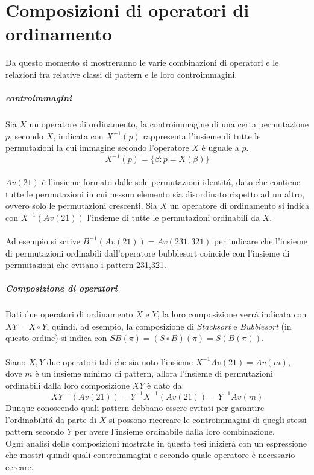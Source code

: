 \chapter{Composizioni di operatori di ordinamento}
Da questo momento si mostreranno le varie combinazioni di operatori e le relazioni tra relative classi di pattern e le loro controimmagini.
\paragraph*{controimmagini} Sia $X$ un operatore di ordinamento, la controimmagine di una certa permutazione $p$, secondo $X$, indicata con $X^{-1}(p)$ rappresenta l'insieme di tutte le permutazioni la cui immagine secondo l'operatore $X$ \`e uguale a $p$.$$X^{-1}(p) = \{\beta : p = X(\beta)\}$$\\
$Av(21)$ \`e l'insieme formato dalle sole permutazioni identit\'a, dato che contiene tutte le permutazioni in cui nessun elemento sia disordinato rispetto ad un altro, ovvero solo le permutazioni crescenti. Sia $X$ un operatore di ordinamento si indica con $X^{-1}(Av(21))$ l'insieme di tutte le permutazioni ordinabili da $X$.\\\\
Ad esempio si scrive $B^{-1}(Av(21)) = Av(231,321)$ per indicare che l'insieme di permutazioni ordinabili dall'operatore bubblesort coincide con l'insieme di permutazioni che evitano i pattern 231,321\cite{claesson2012sorting}.
\paragraph*{Composizione di operatori} Dati due operatori di ordinamento $X$ e $Y$, la loro composizione verr\'a indicata con $ XY = X \circ Y$, quindi, ad esempio, la composizione di \textit{Stacksort} e \textit{Bubblesort} (in questo ordine) si indica con $SB(\pi) = (S \circ B)(\pi) = S(B(\pi))$.\\\\
Siano $X,Y$ due operatori tali che sia noto l'insieme $X^{-1}Av(21) = Av(m)$, dove $m$ \`e un insieme minimo di pattern, allora l'insieme di permutazioni ordinabili dalla loro composizione $XY$ \`e dato da:
$$XY^{-1}(Av(21)) = Y^{-1}X^{-1}(Av(21)) = Y^{-1}Av(m)$$ 
Dunque conoscendo quali pattern debbano essere evitati per garantire l'ordinabilit\'a da parte di $X$ si possono ricercare le controimmagini di quegli stessi pattern secondo $Y$ per avere l'insieme ordinabile dalla loro combinazione.\\Ogni analisi delle composizioni mostrate in questa tesi inizier\'a con un espressione che mostri quindi quali controimmagini e secondo quale operatore \`e necessario cercare.
